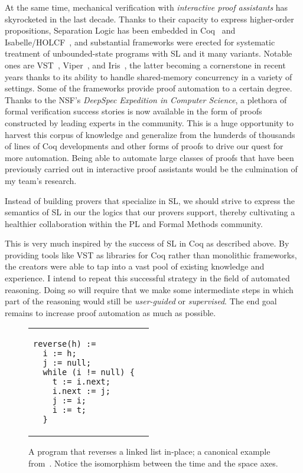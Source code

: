 At the same time, mechanical verification with \emph{interactive proof assistants} has skyrocketed in the last decade.
Thanks to their capacity to express higher-order propositions, Separation Logic has been embedded in Coq~\cite{PLDI2015:Sergey} and Isabelle/HOLCF~\cite{MFPS2008:Varming},
and substantial frameworks were erected for systematic treatment of unbounded-state programs with SL and it many variants.
Notable ones are VST~\cite{JAR2018:Cao}, Viper~\cite{VMCAI2016:Muller}, and Iris~\cite{POPL2015:Jung,ICFP2016:Jung,ESOP2017:Krebbers}, the latter becoming a cornerstone in recent years thanks to its ability to handle shared-memory concurrency in a variety of settings.
Some of the frameworks provide proof automation to a certain degree.
Thanks to the NSF's \emph{DeepSpec Expedition in Computer Science}, a plethora of formal verification success stories is now available in the form of proofs constructed by leading experts in the community.
This is a huge opportunity to harvest this corpus of knowledge and generalize from the hunderds of thousands of lines of Coq developments and other forms of proofs to drive our quest for more automation.
Being able to automate large classes of proofs that have been previously carried out in interactive proof assistants would be the culmination of my team's research.

\begin{proposal}
Instead of building provers that specialize in SL, we should strive to express the semantics of SL in our the logics that our provers support, thereby cultivating a healthier collaboration within the PL and Formal Methods community.
\end{proposal}

This is very much inspired by the success of SL in Coq as described above.
By providing tools like VST as libraries for Coq rather than monolithic frameworks, the creators were able to tap into a vast pool of existing knowledge and experience.
I intend to repeat this successful strategy in the field of automated reasoning.
Doing so will require that we make some intermediate steps in which part of the reasoning would still be
\emph{user-guided} or \emph{supervised}.
The end goal remains to increase proof automation as much as possible.


\begin{figure}[b]
\centering
\begin{tabular}{ll}
\begin{lstlisting}[basicstyle=\linespread{1.36}\ttfamily\fontsize{10pt}{8pt}\selectfont]
reverse(h) :=
  i := h;
  j := null;
  while (i != null) {
    t := i.next;
    i.next := j;
    j := i;
    i := t;
  }
\end{lstlisting}
&

\end{tabular}
\caption{A program that reverses a linked list in-place;
 a canonical example from~\cite{LICS2002:Reynolds}.
 Notice the isomorphism between the time and the space axes.
 }
\label{b2:software-reverse}
\end{figure}

